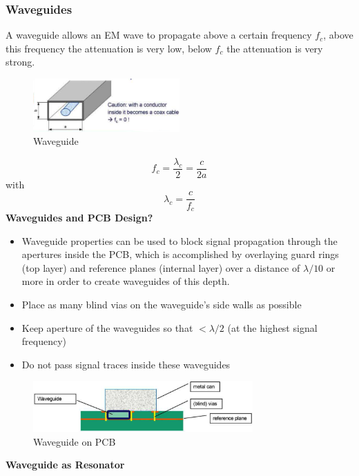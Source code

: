 		\subsubsection{Waveguides}
		A waveguide allows an EM wave to propagate above a certain frequency $f_c$, above this frequency the attenuation is very low, below $f_c$ the attenuation is very strong. 
		\begin{figure}[h]
			\centering
			\includegraphics[width=0.5\textwidth]{images/Waveguide.png}
			\caption{Waveguide}
			\label{Fig:Waveguide}
		\end{figure}
		\begin{equation}
			f_c = \frac{\lambda_c}{2} = \frac{c}{2a}
		\end{equation}
		with 
		\begin{equation}
			\lambda_c = \frac{c}{f_c}
		\end{equation}
		\textbf{Waveguides and PCB Design?} 
		\begin{itemize}
			\item Waveguide properties can be used to block signal propagation through the apertures inside the PCB, which is accomplished by overlaying guard rings (top layer) and reference planes (internal layer) over a distance of $\lambda/10$ or more in order to create waveguides of this depth. 
			\item Place as many blind vias on the waveguide's side walls as possible
			\item Keep aperture of the waveguides so that  $< \lambda/2$ (at the highest signal frequency)
			\item Do not pass signal traces inside these waveguides
		\end{itemize}
		\begin{figure}[h]
			\centering
			\includegraphics[width=0.75\textwidth]{images/PCBWaveguides.png}
			\caption{Waveguide on PCB}
			\label{Fig:PCBWaveguide}
		\end{figure}
		\textbf{Waveguide as Resonator} \\
